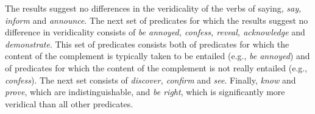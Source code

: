 \documentclass[11pt,fleqn]{article}
\newcommand*\rot{\multicolumn{1}{R{90}{1em}}}%
\newcommand{\6}{\mbox{$[\hspace*{-.6mm}[$}}
\newcommand{\9}{\mbox{$]\hspace*{-.6mm}]$}}
\begin{document}
The results suggest no differences in the veridicality of the verbs of saying, {\em say, inform} and {\em announce}. The next set of predicates for which the results suggest no difference in veridicality consists of {\em be annoyed, confess, reveal, acknowledge} and {\em demonstrate}. This set of predicates consists both of predicates for which the content of the complement is typically taken to be entailed (e.g., {\em be annoyed}) and of predicates for which the content of the complement is not really entailed (e.g., {\em confess}). The next set consists of {\em discover, confirm} and {\em see}. Finally, {\em know} and {\em prove}, which are indistinguishable, and {\em be right}, which is significantly more veridical than all other predicates.

%
\end{document}
